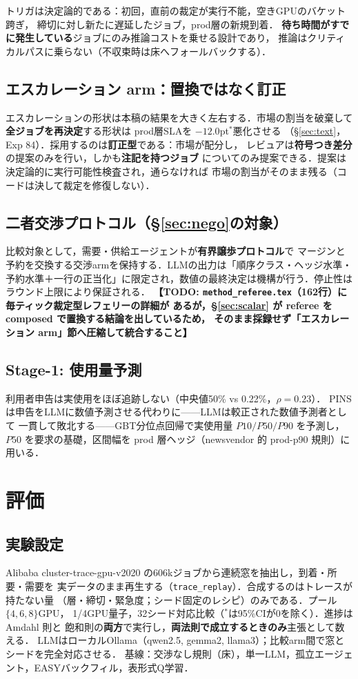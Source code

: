 \documentclass[uplatex,twocolumn,fontsize=9pt,paper=a4]{jlreq}
\newcommand{\todo}[1]{\textbf{【TODO: #1】}}
\newcommand{\sig}{$^{*}$}
\begin{document}
トリガは決定論的である：初回，直前の裁定が実行不能，空きGPUのバケット跨ぎ，
締切に対し新たに遅延したジョブ，prod層の新規到着．
\textbf{待ち時間がすでに発生している}ジョブにのみ推論コストを乗せる設計であり，
推論はクリティカルパスに乗らない（不収束時は床へフォールバックする）．

\subsection{エスカレーション arm：置換ではなく訂正}
エスカレーションの形状は本稿の結果を大きく左右する．市場の割当を破棄して
\textbf{全ジョブを再決定}する形状は prod層SLAを $-12.0$pt\sig 悪化させる
（\S\ref{sec:text}，Exp 84）．採用するのは\textbf{訂正型}である：市場が配分し，
レビュアは\textbf{符号つき差分}の提案のみを行い，しかも\textbf{注記を持つジョブ}
についてのみ提案できる．提案は決定論的に実行可能性検査され，通らなければ
市場の割当がそのまま残る（コードは決して裁定を修復しない）．

\subsection{二者交渉プロトコル（\S\ref{sec:nego}の対象）}
比較対象として，需要・供給エージェントが\textbf{有界譲歩プロトコル}で
マージンと予約を交換する交渉armを保持する．LLMの出力は「順序クラス・ヘッジ水準・
予約水準＋一行の正当化」に限定され，数値の最終決定は機構が行う．停止性は
ラウンド上限により保証される．
\todo{\texttt{method\_referee.tex}（162行）に毎ティック裁定型レフェリーの詳細が
あるが，\S\ref{sec:scalar} が referee を composed で置換する結論を出しているため，
そのまま採録せず「エスカレーション arm」節へ圧縮して統合すること}

\subsection{Stage-1: 使用量予測}
利用者申告は実使用をほぼ追跡しない（中央値50\% vs 0.22\%，$\rho=0.23$）．
PINSは申告をLLMに数値予測させる代わりに——LLMは較正された数値予測者として
一貫して敗北する——GBT分位点回帰で実使用量 $P10/P50/P90$ を予測し，
$P50$ を要求の基礎，区間幅を prod 層ヘッジ（newsvendor 的 prod-p90 規則）に用いる．

\section{評価}\label{sec:eval}
\subsection{実験設定}
Alibaba cluster-trace-gpu-v2020 の606kジョブから連続窓を抽出し，到着・所要・需要を
実データのまま再生する（\texttt{trace\_replay}）．合成するのはトレースが持たない量
（層・締切・緊急度；シード固定のレシピ）のみである．プール$\{4,6,8\}$GPU，
1/4GPU量子，32シード対応比較（\sig は95\%CIが0を除く）．進捗は Amdahl 則と
飽和則の\textbf{両方}で実行し，\textbf{両法則で成立するときのみ}主張として数える．
LLMはローカルOllama（qwen2.5, gemma2, llama3）；比較arm間で窓とシードを完全対応させる．
基線：交渉なし規則（床），単一LLM，孤立エージェント，EASYバックフィル，表形式Q学習．
\end{document}
